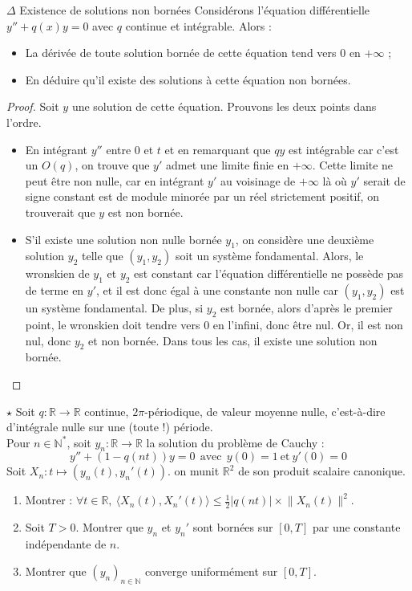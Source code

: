 \documentclass[french,a4paper]{article}
\newcommand{\N}{\mathbb{N}}
\newcommand{\R}{\mathbb{R}}
\newcommand{\st}{^*}
\theoremstyle{plain}
\theoremstyle{definition}
\theoremstyle{remark}
\begin{document}
\begin{ex}[Moulin.50]{$\Delta$ Existence de solutions non bornées} Considérons l'équation différentielle $y''+q(x)y=0$ avec $q$ continue et intégrable. Alors :
	\begin{itemize}
		\item La dérivée de toute solution bornée de cette équation tend vers $0$ en $+\infty$ ;
		\item En déduire qu'il existe des solutions à cette équation non bornées.
	\end{itemize}
\end{ex}
\begin{proof}
	Soit $y$ une solution de cette équation. Prouvons les deux points dans l'ordre.
	\begin{itemize}
		\item En intégrant $y''$ entre $0$ et $t$ et en remarquant que $qy$ est intégrable car c'est un $O(q)$, on trouve que $y'$ admet une limite finie en $+\infty$. Cette limite ne peut être non nulle, car en intégrant $y'$ au voisinage de $+\infty$ là où $y'$ serait de signe constant est de module minorée par un réel strictement positif, on trouverait que $y$ est non bornée.
		\item S'il existe une solution non nulle bornée $y_1$, on considère une deuxième solution $y_2$ telle que $(y_1,y_2)$ soit un système fondamental. Alors, le wronskien de $y_1$ et $y_2$ est constant car l'équation différentielle ne possède pas de terme en $y'$, et il est donc égal à une constante non nulle car $(y_1,y_2)$ est un système fondamental. De plus, si $y_2$ est bornée, alors d'après le premier point, le wronskien doit tendre vers $0$ en l'infini, donc être nul. Or, il est non nul, donc $y_2$ et non bornée. Dans tous les cas, il existe une solution non bornée.
	\end{itemize}
\end{proof}

\begin{ex}[Moulin.51]{$\star$}
	Soit $q:\R\to\R$ continue, $2\pi$-périodique, de valeur moyenne nulle, c'est-à-dire d'intégrale nulle sur une (toute !) période. \\ Pour $n\in\N\st$, soit $y_n:\R\to\R$ la solution du problème de Cauchy : $$y''+(1-q(nt))y=0\ \ \text{avec}\ \ y(0)=1\ \text{et}\ y'(0)=0$$
	Soit $X_n:t\mapsto(y_n(t),y_n'(t))$. on munit $\R^2$ de son produit scalaire canonique.
	\begin{enumerate}
		\item Montrer : $\displaystyle\forall t\in\R,\ \langle X_n(t),X_n'(t)\rangle\leqslant\frac{1}{2}\lvert q(nt)\rvert\times\lVert X_n(t)\rVert^2$.
		\item Soit $T>0$. Montrer que $y_n$ et $y_n'$ sont bornées sur $[0,T]$ par une constante indépendante de $n$.
		\item Montrer que $(y_n)_{n\in\N}$ converge uniformément sur $[0,T]$.
	\end{enumerate}
\end{ex}
\end{document}
